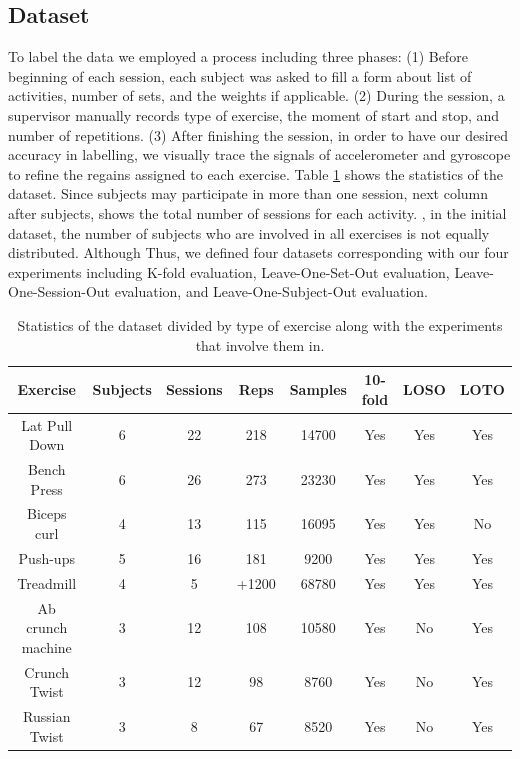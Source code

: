\documentclass[journal,article,submit,moreauthors,pdftex]{Definitions/mdpi}
\begin{document}
\subsection{Dataset}
To label the data we employed a process including three phases: (1) Before beginning of each session, each subject was asked to fill a form about list of activities, number of sets, and the weights if applicable. (2) During the session, a supervisor manually records type of exercise, the moment of start and stop, and number of repetitions. (3) After finishing the session, in order to have our desired accuracy in labelling, we visually trace the signals of accelerometer and gyroscope to refine the regains assigned to each exercise.
Table \ref{dataset_statistics} shows the statistics of the dataset. Since subjects may participate in more than one session, next column after subjects, shows the total number of sessions for each activity.  , in the initial dataset, the number of subjects who are involved in all exercises is not equally distributed. Although  Thus, we defined four datasets corresponding with our four experiments including K-fold evaluation, Leave-One-Set-Out evaluation, Leave-One-Session-Out evaluation, and Leave-One-Subject-Out evaluation.
\begin{table}[H]
	\caption{Statistics of the dataset divided by type of exercise along with the experiments that involve them in.}
	\centering
	\begin{tabular}{cccccccc}
		\toprule
		\textbf{Exercise} & \textbf{Subjects} & \textbf{Sessions}	 & \textbf{Reps} & \textbf{Samples} & \textbf{10-fold} & \textbf{LOSO} & \textbf{LOTO} \\
		\midrule		
		Lat Pull Down& 6& 22& 218& 14700& Yes& Yes& Yes\\
		Bench Press	& 6& 26& 273& 23230& Yes& Yes& Yes\\
		Biceps curl	& 4& 13& 115& 16095&Yes& Yes& No\\
		Push-ups & 5& 16& 181& 9200& Yes& Yes& Yes\\
		Treadmill& 4& 5& +1200 & 68780& Yes& Yes& Yes\\
		Ab crunch machine& 3& 12& 108 & 10580& Yes& No& Yes\\
		Crunch Twist &  3& 12& 98& 8760& Yes& No& Yes\\
		Russian Twist & 3& 8& 67& 8520& Yes& No& Yes\\
		\bottomrule
	\end{tabular}
	\label{dataset_statistics}
\end{table}
\end{document}
